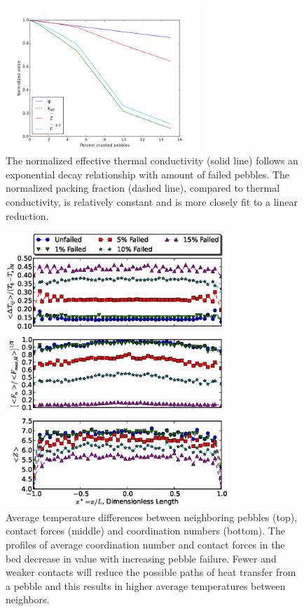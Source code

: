 \begin{figure}[htbp]
	\centering
	\includegraphics[width=0.65\textwidth]{chapters/figures/kEff_packingFraction}
	\caption{The normalized effective thermal conductivity (solid line) follows an exponential decay relationship with amount of failed pebbles. The normalized packing fraction (dashed line), compared to thermal conductivity, is relatively constant and is more closely fit to a linear reduction.}
\label{fig:packingFraction}
\end{figure}

\begin{figure}[htbp]
	\centering
	\includegraphics[width=0.75\textwidth]{chapters/figures/z_f_deltaT_subPlots}
	\caption{Average temperature differences between neighboring pebbles (top), contact forces (middle) and coordination numbers (bottom). The profiles of average coordination number and contact forces in the bed decrease in value with increasing pebble failure. Fewer and weaker contacts will reduce the possible paths of heat transfer from a pebble and this results in higher average temperatures between neighbors.}
\label{fig:coordProfiles}
\end{figure}


